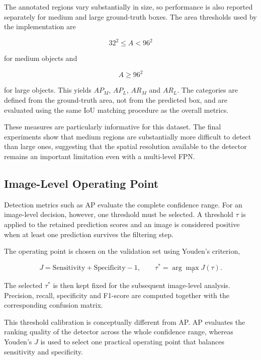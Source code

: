 \documentclass[11pt,a4paper]{article}
\begin{document}
The annotated regions vary substantially in size, so performance is also
reported separately for medium and large ground-truth boxes. The area
thresholds used by the implementation are

\begin{equation}
32^2\leq A<96^2
\end{equation}

for medium objects and

\begin{equation}
A\geq96^2
\end{equation}

for large objects. This yields $AP_M$, $AP_L$, $AR_M$ and $AR_L$.
The categories are defined from the ground-truth area, not from the predicted
box, and are evaluated using the same IoU matching procedure as the overall
metrics.

These measures are particularly informative for this dataset. The final
experiments show that medium regions are substantially more difficult to
detect than large ones, suggesting that the spatial resolution available to
the detector remains an important limitation even with a multi-level FPN.

\subsection{Image-Level Operating Point}
\label{subsec:post_training_analysis}

Detection metrics such as AP evaluate the complete confidence range. For an
image-level decision, however, one threshold must be selected. A threshold
$\tau$ is applied to the retained prediction scores and an image is considered
positive when at least one prediction survives the filtering step.

The operating point is chosen on the validation set using Youden's criterion,

\begin{equation}
J=\mathrm{Sensitivity}+\mathrm{Specificity}-1,
\qquad
\tau^*=\arg\max_{\tau}J(\tau).
\end{equation}

The selected $\tau^*$ is then kept fixed for the subsequent image-level
analysis. Precision, recall, specificity and F1-score are computed together
with the corresponding confusion matrix.

This threshold calibration is conceptually different from AP. AP evaluates
the ranking quality of the detector across the whole confidence range,
whereas Youden's $J$ is used to select one practical operating point that
balances sensitivity and specificity.
\end{document}
